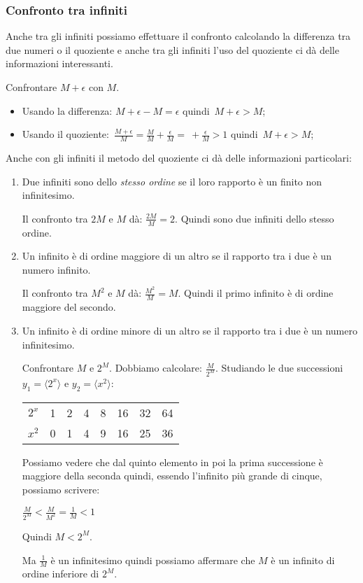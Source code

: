 \subsubsection{Confronto tra infiniti}
\label{subsubsec:insnum_confrontoreali}

Anche tra gli infiniti possiamo effettuare il confronto calcolando la 
differenza tra due numeri o il quoziente e anche tra gli infiniti l'uso del 
quoziente ci dà delle informazioni interessanti.

\begin{esempio}
Confrontare $M+\epsilon$ con $M$.
\begin{itemize}
 \item Usando la differenza: $M+\epsilon - M = \epsilon$ 
quindi~$M+\epsilon > M$;
 \item Usando il quoziente:~$\frac{M+\epsilon}{M}= 
\frac{M}{M}+\frac{\epsilon}{M}= \ + \frac{\epsilon}{M} > 1$
quindi~$M+\epsilon > M$;
\end{itemize}
\end{esempio}

Anche con gli infiniti il metodo del quoziente ci dà delle informazioni 
particolari:

\begin{enumerate}
 \item Due infiniti sono dello \emph{stesso ordine} se il loro rapporto è un 
finito non infinitesimo.
\begin{esempio}
 Il confronto tra $2M$ e $M$ dà: $\frac{2M}{M} = 2$. Quindi sono due infiniti 
dello stesso ordine.
\end{esempio}
 \item Un infinito è di ordine maggiore di un altro se il rapporto tra i due è 
un numero infinito.
\begin{esempio}
 Il confronto tra $M^2$ e $M$ dà: $\frac{M^2}{M} = M$. Quindi il primo infinito 
è di ordine maggiore del secondo.
\end{esempio}
 \item Un infinito è di ordine minore di un altro se il rapporto tra i due è 
un numero infinitesimo.
\begin{esempio}
 Confrontare $M$ e $2^M$. Dobbiamo calcolare: $\frac{M}{2^M}$. 
Studiando le due successioni 
$y_1=\langle 2^x \rangle$ e $y_2=\langle x^2 \rangle$:
\begin{center}
\begin{tabular}{cccccccc}
$2^x$ & 1 & 2 & 4 & 8 & 16 & 32 & 64\\
$x^2$ & 0 & 1 & 4 & 9 & 16 & 25 & 36
\end{tabular}
\end{center}

Possiamo vedere che dal quinto elemento in poi la prima successione è maggiore 
della seconda quindi, essendo l'infinito più grande di cinque, possiamo 
scrivere:

$\frac{M}{2^M} < \frac{M}{M^2} = \frac{1}{M} < 1$

Quindi $M < 2^M$.

Ma $\frac{1}{M}$ è un infinitesimo quindi possiamo affermare che $M$ è un 
infinito di ordine inferiore di $2^M$.
\end{esempio}
\end{enumerate}

